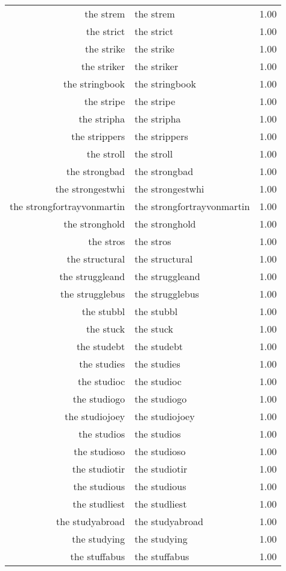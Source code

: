 \begin{table}[ht]
\begin{tabular}{rlr}
  the strem & the strem & 1.00 \\ 
  the strict & the strict & 1.00 \\ 
  the strike & the strike & 1.00 \\ 
  the striker & the striker & 1.00 \\ 
  the stringbook & the stringbook & 1.00 \\ 
  the stripe & the stripe & 1.00 \\ 
  the stripha & the stripha & 1.00 \\ 
  the strippers & the strippers & 1.00 \\ 
  the stroll & the stroll & 1.00 \\ 
  the strongbad & the strongbad & 1.00 \\ 
  the strongestwhi & the strongestwhi & 1.00 \\ 
  the strongfortrayvonmartin & the strongfortrayvonmartin & 1.00 \\ 
  the stronghold & the stronghold & 1.00 \\ 
  the stros & the stros & 1.00 \\ 
  the structural & the structural & 1.00 \\ 
  the struggleand & the struggleand & 1.00 \\ 
  the strugglebus & the strugglebus & 1.00 \\ 
  the stubbl & the stubbl & 1.00 \\ 
  the stuck & the stuck & 1.00 \\ 
  the studebt & the studebt & 1.00 \\ 
  the studies & the studies & 1.00 \\ 
  the studioc & the studioc & 1.00 \\ 
  the studiogo & the studiogo & 1.00 \\ 
  the studiojoey & the studiojoey & 1.00 \\ 
  the studios & the studios & 1.00 \\ 
  the studioso & the studioso & 1.00 \\ 
  the studiotir & the studiotir & 1.00 \\ 
  the studious & the studious & 1.00 \\ 
  the studliest & the studliest & 1.00 \\ 
  the studyabroad & the studyabroad & 1.00 \\ 
  the studying & the studying & 1.00 \\ 
  the stuffabus & the stuffabus & 1.00 \\ 

\end{tabular}
\end{table}

